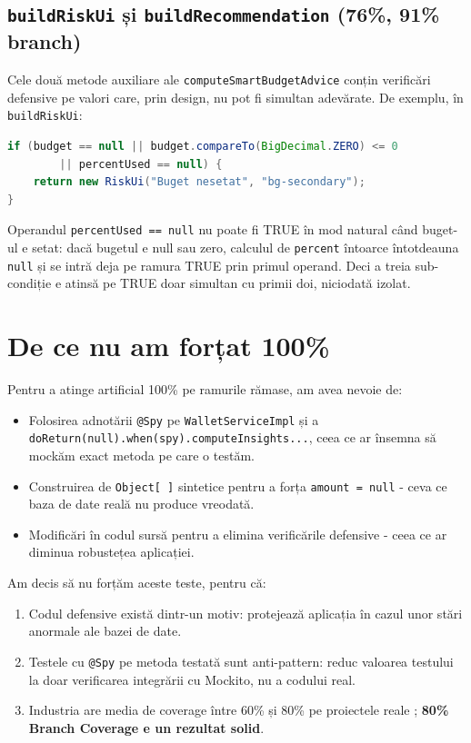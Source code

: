 \subsection{\texttt{buildRiskUi} și \texttt{buildRecommendation} (76\%, 91\% branch)}

Cele două metode auxiliare ale \texttt{computeSmartBudgetAdvice} conțin verificări defensive pe valori care, prin design, nu pot fi simultan adevărate. De exemplu, în \texttt{buildRiskUi}:

\begin{lstlisting}[language=Java]
if (budget == null || budget.compareTo(BigDecimal.ZERO) <= 0
        || percentUsed == null) {
    return new RiskUi("Buget nesetat", "bg-secondary");
}
\end{lstlisting}

Operandul \texttt{percentUsed == null} nu poate fi TRUE în mod natural când buget-ul e setat: dacă bugetul e null sau zero, calculul de \texttt{percent} întoarce întotdeauna \texttt{null} și se intră deja pe ramura TRUE prin primul operand. Deci a treia sub-condiție e atinsă pe TRUE doar simultan cu primii doi, niciodată izolat.

\section{De ce nu am forțat 100\%}

Pentru a atinge artificial 100\% pe ramurile rămase, am avea nevoie de:

\begin{itemize}
    \item Folosirea adnotării \texttt{@Spy} pe \texttt{WalletServiceImpl} și a \texttt{doReturn(null).when(spy).computeInsights...}, ceea ce ar însemna să mockăm exact metoda pe care o testăm.
    \item Construirea de \texttt{Object[\,]} sintetice pentru a forța \texttt{amount = null} - ceva ce baza de date reală nu produce vreodată.
    \item Modificări în codul sursă pentru a elimina verificările defensive - ceea ce ar diminua robustețea aplicației.
\end{itemize}

Am decis să nu forțăm aceste teste, pentru că:

\begin{enumerate}
    \item Codul defensive există dintr-un motiv: protejează aplicația în cazul unor stări anormale ale bazei de date.
    \item Testele cu \texttt{@Spy} pe metoda testată sunt anti-pattern: reduc valoarea testului la doar verificarea integrării cu Mockito, nu a codului real.
    \item Industria are media de coverage între 60\% și 80\% pe proiectele reale \cite{google_coverage}; \textbf{80\% Branch Coverage e un rezultat solid}.
\end{enumerate}


